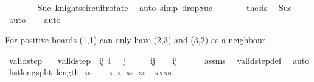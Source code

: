 \begin{isabellebody}
\ \ \ \ \ \ \isamarkupfalse%
\ Suc\ knights{\isacharunderscore}{\kern0pt}circuit{\isacharunderscore}{\kern0pt}rotate{}\ \isamarkupfalse%
\ {\isacharparenleft}{\kern0pt}auto\ simp{\isacharcolon}{\kern0pt}\ drop{\isacharunderscore}{\kern0pt}Suc{\isacharparenright}{\kern0pt}\isanewline
\ \ \ \ \isamarkupfalse%
\ \isamarkupfalse%
\ {\isacharquery}{\kern0pt}thesis\ \isamarkupfalse%
\ Suc\ \isamarkupfalse%
\ auto\isanewline
\ \ \isamarkupfalse%
\isanewline
{}\isamarkupfalse%
\ auto%
\endisatagproof
{\isafoldproof}%
%
\isadelimproof
%
\endisadelimproof
%
\begin{isamarkuptext}%
For positive boards (1,1) can only have (2,3) and (3,2) as a neighbour.%
\end{isamarkuptext}\isamarkuptrue%
\isamarkupfalse%
\ valid{\isacharunderscore}{\kern0pt}step{\isacharunderscore}{\kern0pt}{}{\isacharunderscore}{\kern0pt}{}{\isacharcolon}{\kern0pt}\isanewline
\ \ \ {\isachardoublequoteopen}valid{\isacharunderscore}{\kern0pt}step\ {\isacharparenleft}{\kern0pt}{}{\isacharcomma}{\kern0pt}{}{\isacharparenright}{\kern0pt}\ {\isacharparenleft}{\kern0pt}i{\isacharcomma}{\kern0pt}j{\isacharparenright}{\kern0pt}{\isachardoublequoteclose}\ {\isachardoublequoteopen}i\ {\isachargreater}{\kern0pt}\ {}{\isachardoublequoteclose}\ {\isachardoublequoteopen}j\ {\isachargreater}{\kern0pt}\ {}{\isachardoublequoteclose}\isanewline
\ \ \ {\isachardoublequoteopen}{\isacharparenleft}{\kern0pt}i{\isacharcomma}{\kern0pt}j{\isacharparenright}{\kern0pt}\ {\isacharequal}{\kern0pt}\ {\isacharparenleft}{\kern0pt}{}{\isacharcomma}{\kern0pt}{}{\isacharparenright}{\kern0pt}\ {\isasymor}\ {\isacharparenleft}{\kern0pt}i{\isacharcomma}{\kern0pt}j{\isacharparenright}{\kern0pt}\ {\isacharequal}{\kern0pt}\ {\isacharparenleft}{\kern0pt}{}{\isacharcomma}{\kern0pt}{}{\isacharparenright}{\kern0pt}{\isachardoublequoteclose}\isanewline
%
\isadelimproof
\ \ %
\endisadelimproof
%
\isatagproof
{}\isamarkupfalse%
\ assms\ \isamarkupfalse%
\ valid{\isacharunderscore}{\kern0pt}step{\isacharunderscore}{\kern0pt}def\ \isamarkupfalse%
\ auto%
\endisatagproof
{\isafoldproof}%
%
\isadelimproof
\isanewline
%
\endisadelimproof
\isanewline
{}\isamarkupfalse%
\ list{\isacharunderscore}{\kern0pt}len{\isacharunderscore}{\kern0pt}g{\isacharunderscore}{\kern0pt}{}{\isacharunderscore}{\kern0pt}split{\isacharcolon}{\kern0pt}\ {\isachardoublequoteopen}length\ xs\ {\isachargreater}{\kern0pt}\ {}\ {\isasymLongrightarrow}\ {\isasymexists}x\ x\ xs{\isacharprime}{\kern0pt}{\isachardot}{\kern0pt}\ xs\ {\isacharequal}{\kern0pt}\ xxxs{\isacharprime}{\kern0pt}{\isachardoublequoteclose}\isanewline

\end{isabellebody}
